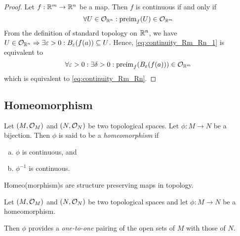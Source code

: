 \begin{proof}
	Let \(f: \mathbb R^m \to \mathbb R^n\) be a map. Then \(f\) is continuous if and only if
	\begin{equation}
		\forall U \in \mathcal{O}_{\mathbb R^n}: \operatorname{preim}_{f}(U) \in \mathcal{O}_{\mathbb R^m} \label{eq:continuity_Rm_Rn_1}
	\end{equation}
	From the definition of standard topology on \(\mathbb R^n\), we have \(U \in \mathcal{O}_{\mathbb R^n} \Rightarrow \exists \varepsilon > 0: B_{\varepsilon}(f(a)) \subseteq U\). Hence, \eqref{eq:continuity_Rm_Rn_1} is equivalent to
	\begin{equation}
		\forall \varepsilon > 0: \exists \delta > 0: \operatorname{preim}_{f}(B_{\varepsilon}(f(a))) \in \mathcal{O}_{\mathbb R^m} \label{eq:continuity_Rm_Rn_2}
	\end{equation}
	which is equivalent to \eqref{eq:continuity_Rm_Rn}.
\end{proof}

\subsection{Homeomorphism}

\begin{definition}[Homeomorphism]
	Let \((M, \mathcal{O}_M)\) and \((N, \mathcal{O}_N)\) be two topological spaces. Let \(\phi: M \to N\) be a bijection. Then \(\phi\) is said to be a \emph{homeomorphism} if
	\begin{enumerate}[(a)]
		\item \(\phi\) is continuous, and
		\item \(\phi^{-1}\) is continuous.
	\end{enumerate}
\end{definition}

\begin{remark}
	Homeo(morphism)s are structure preserving maps in topology.
\end{remark}

\begin{remark}
	Let \((M, \mathcal{O}_M)\) and \((N, \mathcal{O}_N)\) be two topological spaces and let \(\phi: M \to N\) be a homeomorphism.
	\begin{figure}[H]
		\centering
	\end{figure}
	Then \(\phi\) provides a \emph{one-to-one} pairing of the open sets of \(M\) with those of \(N\).
\end{remark}

